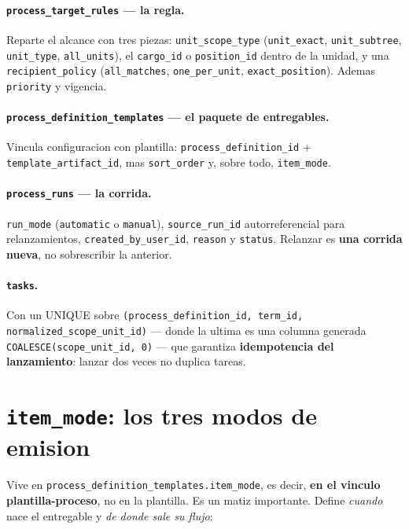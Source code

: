 \documentclass[11pt,a4paper,oneside]{report}
\newcommand{\rt}[1]{\texttt{#1}}
\begin{document}
\paragraph{\rt{process\_target\_rules} --- la regla.}
Reparte el alcance con tres piezas: \rt{unit\_scope\_type} (\rt{unit\_exact},
\rt{unit\_subtree}, \rt{unit\_type}, \rt{all\_units}), el \rt{cargo\_id} o \rt{position\_id}
dentro de la unidad, y una \rt{recipient\_policy} (\rt{all\_matches}, \rt{one\_per\_unit},
\rt{exact\_position}). Ademas \rt{priority} y vigencia.

\paragraph{\rt{process\_definition\_templates} --- el paquete de entregables.}
Vincula configuracion con plantilla: \rt{process\_definition\_id} + \rt{template\_artifact\_id},
mas \rt{sort\_order} y, sobre todo, \rt{item\_mode}.

\paragraph{\rt{process\_runs} --- la corrida.}
\rt{run\_mode} (\rt{automatic} o \rt{manual}), \rt{source\_run\_id} autorreferencial para
relanzamientos, \rt{created\_by\_user\_id}, \rt{reason} y \rt{status}. Relanzar es \textbf{una
corrida nueva}, no sobrescribir la anterior.

\paragraph{\rt{tasks}.}
Con un UNIQUE sobre \rt{(process\_definition\_id, term\_id, normalized\_scope\_unit\_id)} ---
donde la ultima es una columna generada \rt{COALESCE(scope\_unit\_id, 0)} --- que garantiza
\textbf{idempotencia del lanzamiento}: lanzar dos veces no duplica tareas.

\section{\rt{item\_mode}: los tres modos de emision}

Vive en \rt{process\_definition\_templates.item\_mode}, es decir, \textbf{en el vinculo
plantilla-proceso}, no en la plantilla. Es un matiz importante. Define \emph{cuando} nace el
entregable y \emph{de donde sale su flujo}:
\end{document}
